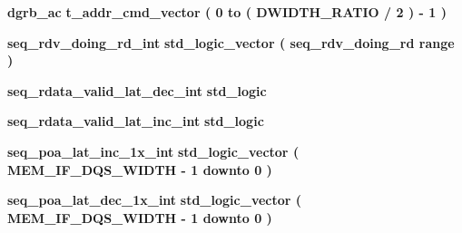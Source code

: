 \begin{DoxyCompactItemize}
\item 
{\bf dgrb\+\_\+ac} {\bfseries \textcolor{vhdlchar}{t\+\_\+addr\+\_\+cmd\+\_\+vector}\textcolor{vhdlchar}{ }\textcolor{vhdlchar}{(}\textcolor{vhdlchar}{ }\textcolor{vhdlchar}{ } \textcolor{vhdldigit}{0} \textcolor{vhdlchar}{ }\textcolor{keywordflow}{to}\textcolor{vhdlchar}{ }\textcolor{vhdlchar}{(}\textcolor{vhdlchar}{ }\textcolor{vhdlchar}{ }\textcolor{vhdlchar}{ }\textcolor{vhdlchar}{ }{\bfseries {\bf D\+W\+I\+D\+T\+H\+\_\+\+R\+A\+T\+IO}} \textcolor{vhdlchar}{/}\textcolor{vhdlchar}{ } \textcolor{vhdldigit}{2} \textcolor{vhdlchar}{ }\textcolor{vhdlchar}{)}\textcolor{vhdlchar}{ }\textcolor{vhdlchar}{-\/}\textcolor{vhdlchar}{ } \textcolor{vhdldigit}{1} \textcolor{vhdlchar}{ }\textcolor{vhdlchar}{)}\textcolor{vhdlchar}{ }} 
\item 
{\bf seq\+\_\+rdv\+\_\+doing\+\_\+rd\+\_\+int} {\bfseries \textcolor{comment}{std\+\_\+logic\+\_\+vector}\textcolor{vhdlchar}{ }\textcolor{vhdlchar}{(}\textcolor{vhdlchar}{ }{\bfseries {\bf seq\+\_\+rdv\+\_\+doing\+\_\+rd}} \textcolor{vhdlchar}{ }\textcolor{vhdlchar}{\textquotesingle{}}\textcolor{vhdlchar}{ }\textcolor{keywordflow}{range}\textcolor{vhdlchar}{ }\textcolor{vhdlchar}{ }\textcolor{vhdlchar}{)}\textcolor{vhdlchar}{ }} 
\item 
{\bf seq\+\_\+rdata\+\_\+valid\+\_\+lat\+\_\+dec\+\_\+int} {\bfseries \textcolor{comment}{std\+\_\+logic}\textcolor{vhdlchar}{ }} 
\item 
{\bf seq\+\_\+rdata\+\_\+valid\+\_\+lat\+\_\+inc\+\_\+int} {\bfseries \textcolor{comment}{std\+\_\+logic}\textcolor{vhdlchar}{ }} 
\item 
{\bf seq\+\_\+poa\+\_\+lat\+\_\+inc\+\_\+1x\+\_\+int} {\bfseries \textcolor{comment}{std\+\_\+logic\+\_\+vector}\textcolor{vhdlchar}{ }\textcolor{vhdlchar}{(}\textcolor{vhdlchar}{ }\textcolor{vhdlchar}{ }\textcolor{vhdlchar}{ }\textcolor{vhdlchar}{ }{\bfseries {\bf M\+E\+M\+\_\+\+I\+F\+\_\+\+D\+Q\+S\+\_\+\+W\+I\+D\+TH}} \textcolor{vhdlchar}{-\/}\textcolor{vhdlchar}{ } \textcolor{vhdldigit}{1} \textcolor{vhdlchar}{ }\textcolor{keywordflow}{downto}\textcolor{vhdlchar}{ }\textcolor{vhdlchar}{ } \textcolor{vhdldigit}{0} \textcolor{vhdlchar}{ }\textcolor{vhdlchar}{)}\textcolor{vhdlchar}{ }} 
\item 
{\bf seq\+\_\+poa\+\_\+lat\+\_\+dec\+\_\+1x\+\_\+int} {\bfseries \textcolor{comment}{std\+\_\+logic\+\_\+vector}\textcolor{vhdlchar}{ }\textcolor{vhdlchar}{(}\textcolor{vhdlchar}{ }\textcolor{vhdlchar}{ }\textcolor{vhdlchar}{ }\textcolor{vhdlchar}{ }{\bfseries {\bf M\+E\+M\+\_\+\+I\+F\+\_\+\+D\+Q\+S\+\_\+\+W\+I\+D\+TH}} \textcolor{vhdlchar}{-\/}\textcolor{vhdlchar}{ } \textcolor{vhdldigit}{1} \textcolor{vhdlchar}{ }\textcolor{keywordflow}{downto}\textcolor{vhdlchar}{ }\textcolor{vhdlchar}{ } \textcolor{vhdldigit}{0} \textcolor{vhdlchar}{ }\textcolor{vhdlchar}{)}\textcolor{vhdlchar}{ }} 

\end{DoxyCompactItemize}
